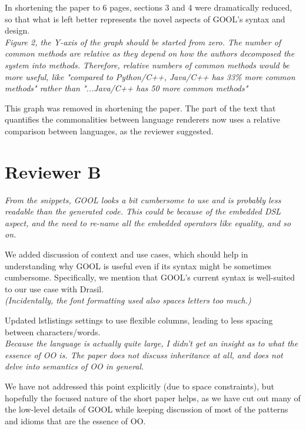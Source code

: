 \documentclass[12pt]{article}
\begin{document}
In shortening the paper to 6 pages, sections 3 and 4 were dramatically reduced, 
so that what is left better represents the novel aspects of GOOL's syntax and 
design. \\

\noindent \textit{Figure 2, the Y-axis of the graph should be started from 
zero.  The 
number of common methods are relative as they depend on how the authors 
decomposed the system into methods.  Therefore, relative numbers of common 
methods would be more useful, like "compared to Python/C++, Java/C++ has 33\% 
more common methods" rather  than "...Java/C++ has 50 more common methods"}

This graph was removed in shortening the paper. The part of the text that 
quantifies the commonalities between language renderers now uses a relative 
comparison between languages, as the reviewer suggested.

\section{Reviewer B}

\textit{From the snippets, GOOL looks a bit cumbersome to use and is probably 
less readable than the generated code. This could be because of the embedded 
DSL aspect, and the need to re-name all the embedded operators like equality, 
and so on.}

We added discussion of context and use cases, which should help in 
understanding why GOOL is useful even if its syntax might be sometimes 
cumbersome. Specifically, we mention that GOOL's current syntax is well-suited 
to our use case with Drasil. \\

\noindent \textit{(Incidentally, the font formatting used also spaces letters 
too much.)}

Updated lstlistings settings to use flexible columns, leading to less spacing 
between characters/words. \\

\noindent \textit{Because the language is actually quite large, I didn't get an 
insight 
as to what the essence of OO is. The paper does not discuss inheritance at all, 
and does not delve into semantics of OO in general.}

We have not addressed this point explicitly (due to space constraints), but 
hopefully the focused nature of the short paper helps, as we have cut out many 
of the low-level details of GOOL while keeping discussion of most of the 
patterns and idioms that are the essence of OO. \\
\end{document}
